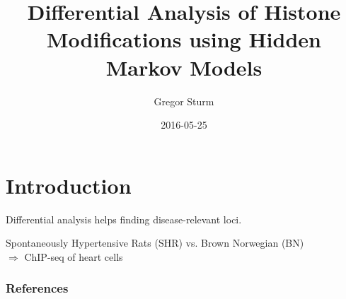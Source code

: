 \documentclass{beamer}
\title[histoneHMM]{Differential Analysis of Histone Modifications using Hidden Markov Models}
\subtitle{}
\date{2016-05-25}
\author{Gregor Sturm}
\institute[ICB]{Institute of Computational Biology\\Helmholtz-Zentrum München}
\begin{document}


\maketitle

\section{Introduction}

\begin{frame}{Differential analysis helps finding disease-relevant loci.}

Spontaneously Hypertensive Rats (SHR) vs. Brown Norwegian (BN)\\
\-\hspace{5mm}$\Rightarrow$ ChIP-seq of heart cells

\end{frame}



\begin{frame}[allowframebreaks]
\frametitle{References}
\printbibliography
\end{frame}
\end{document}
